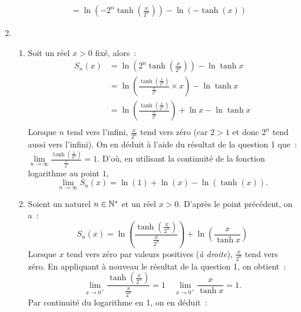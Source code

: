 \begin{corrige}
\begin{enumerate}
\begin{align*}
        &= \ln\left(-2^n\tanh\left(\frac{x}{2^n}\right)\right) - \ln(-\tanh(x))
      \end{align*}
    \item \begin{enumerate}
        \item Soit un réel \(x>0\) fixé, alors~:
          \begin{align*}
            S_n(x)  &= \ln\left(2^n\tanh\left(\frac{x}{2^n}\right)\right) - 
            \ln\tanh x\\
            &= \ln\left(\frac{\tanh\left(\frac{x}{2^n}\right)}{\frac{x}{2^n}} 
            \times x \right) - \ln\tanh x\\
            &= \ln\left(\frac{\tanh\left(\frac{x}{2^n}\right)}{\frac{x}{2^n}} 
            \right) + \ln x - \ln\tanh x\\
          \end{align*}
          Lorsque \(n\) tend vers l'infini, \(\frac{x}{2^n}\) tend vers zéro 
          (car \(2>1\) et donc \(2^n\) tend aussi vers l'infini). On en déduit à 
          l'aide du résultat de la question 1 que~: \(\lim\limits_{n\to \infty} 
          \frac{\tanh\left(\frac{x}{2^n}\right)}{\frac{x}{2^n}} = 1\). D'où, en 
          utilisant la continuité de la fonction logarithme au point \(1\),
          \begin{equation*}
            \lim\limits_{n\to\infty} S_n(x) = \ln(1) + \ln(x) - \ln(\tanh(x)).
          \end{equation*}
        \item Soient un naturel \(n \in \mathbb{N}^*\) et un réel \(x>0\). D'après le 
          point précédent, on a~:
          \begin{equation*}
            S_n(x)= 
            \ln\left(\frac{\tanh\left(\frac{x}{2^n}\right)}{\frac{x}{2^n}} 
            \right) + \ln\left(\frac{x}{\tanh x}\right)
          \end{equation*}
          Lorsque \(x\) tend vers zéro par valeurs positives (\emph{à droite}), 
          \(\frac{x}{2^n}\) tend vers zéro. En appliquant à nouveau le résultat 
          de la question 1, on obtient~:
          \begin{equation*}
            \lim\limits_{x \to 0^+} 
            \frac{\tanh\left(\frac{x}{2^n}\right)}{\frac{x}{2^n}} = 1 \quad 
            \lim\limits_{x \to 0^+} \frac{x}{\tanh x} = 1.
          \end{equation*}
          Par continuité du logarithme en 1, on en déduit~:
          \begin{equation*}

\end{equation*}
\end{enumerate}
\end{enumerate}
\end{corrige}
